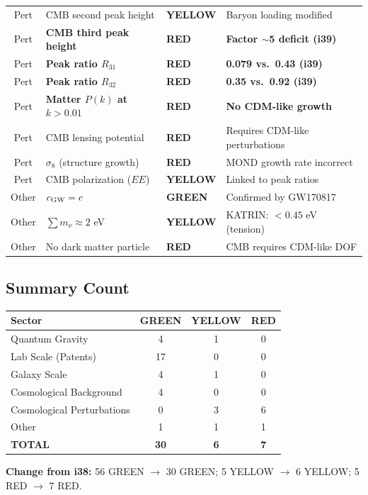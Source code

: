 \documentclass[11pt,a4paper]{article}
\newcommand{\GREEN}{\textcolor{dfdgreen}{\textbf{GREEN}}}
\newcommand{\YELLOW}{\textcolor{dfdyellow}{\textbf{YELLOW}}}
\newcommand{\RED}{\textcolor{dfdred}{\textbf{RED}}}
\begin{document}
\begin{longtable}{clll}
Pert & CMB second peak height & \YELLOW & Baryon loading modified \\
Pert & \textbf{CMB third peak height} & \RED & \textbf{Factor $\sim$5 deficit (i39)} \\
Pert & \textbf{Peak ratio $R_{31}$} & \RED & \textbf{0.079 vs.\ 0.43 (i39)} \\
Pert & \textbf{Peak ratio $R_{32}$} & \RED & \textbf{0.35 vs.\ 0.92 (i39)} \\
Pert & \textbf{Matter $P(k)$ at $k > 0.01$} & \RED & \textbf{No CDM-like growth} \\
Pert & CMB lensing potential & \RED & Requires CDM-like perturbations \\
Pert & $\sigma_8$ (structure growth) & \RED & MOND growth rate incorrect \\
Pert & CMB polarization ($EE$) & \YELLOW & Linked to peak ratios \\
\midrule
Other & $c_{\rm GW} = c$ & \GREEN & Confirmed by GW170817 \\
Other & $\sum m_\nu \approx 2$ eV & \YELLOW & KATRIN: $< 0.45$ eV (tension) \\
Other & No dark matter particle & \RED & CMB requires CDM-like DOF \\
\end{longtable}

\subsection{Summary Count}

\begin{center}
\begin{tabular}{lccc}
\toprule
\textbf{Sector} & \GREEN & \YELLOW & \RED \\
\midrule
Quantum Gravity & 4 & 1 & 0 \\
Lab Scale (Patents) & 17 & 0 & 0 \\
Galaxy Scale & 4 & 1 & 0 \\
Cosmological Background & 4 & 0 & 0 \\
Cosmological Perturbations & 0 & 3 & 6 \\
Other & 1 & 1 & 1 \\
\midrule
\textbf{TOTAL} & \textbf{30} & \textbf{6} & \textbf{7} \\
\bottomrule
\end{tabular}
\end{center}

\textbf{Change from i38:} 56 GREEN $\to$ 30 GREEN; 5 YELLOW $\to$ 6 YELLOW; 5 RED $\to$ 7 RED.
\end{document}
